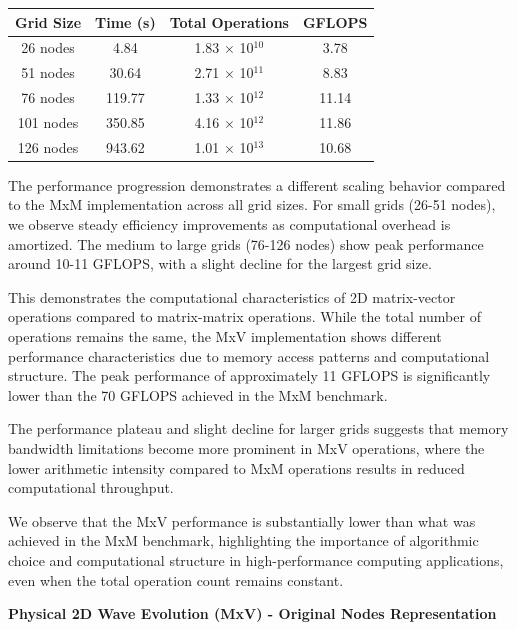 \vspace{1em}

\begin{tabular*}{\linewidth}{@{\extracolsep{\fill}}cccc}
\toprule
\textbf{Grid Size} & \textbf{Time (s)} & \textbf{Total Operations} & \textbf{GFLOPS} \\
\midrule
26 nodes  & 4.84   & 1.83 $\times$ 10$^{10}$ & 3.78 \\
51 nodes  & 30.64  & 2.71 $\times$ 10$^{11}$ & 8.83 \\
76 nodes  & 119.77 & 1.33 $\times$ 10$^{12}$ & 11.14 \\
101 nodes & 350.85 & 4.16 $\times$ 10$^{12}$ & 11.86 \\
126 nodes & 943.62 & 1.01 $\times$ 10$^{13}$ & 10.68 \\
\bottomrule
\end{tabular*}

\vspace{1em}

The performance progression demonstrates a different scaling behavior compared to the MxM implementation across all grid sizes. For small grids (26-51 nodes), we observe steady efficiency improvements as computational overhead is amortized. The medium to large grids (76-126 nodes) show peak performance around 10-11 GFLOPS, with a slight decline for the largest grid size.

This demonstrates the computational characteristics of 2D matrix-vector operations compared to matrix-matrix operations. While the total number of operations remains the same, the MxV implementation shows different performance characteristics due to memory access patterns and computational structure. The peak performance of approximately 11 GFLOPS is significantly lower than the 70 GFLOPS achieved in the MxM benchmark.

The performance plateau and slight decline for larger grids suggests that memory bandwidth limitations become more prominent in MxV operations, where the lower arithmetic intensity compared to MxM operations results in reduced computational throughput.

We observe that the MxV performance is substantially lower than what was achieved in the MxM benchmark, highlighting the importance of algorithmic choice and computational structure in high-performance computing applications, even when the total operation count remains constant.

\clearpage

\textbf{Physical 2D Wave Evolution (MxV) - Original Nodes Representation}

